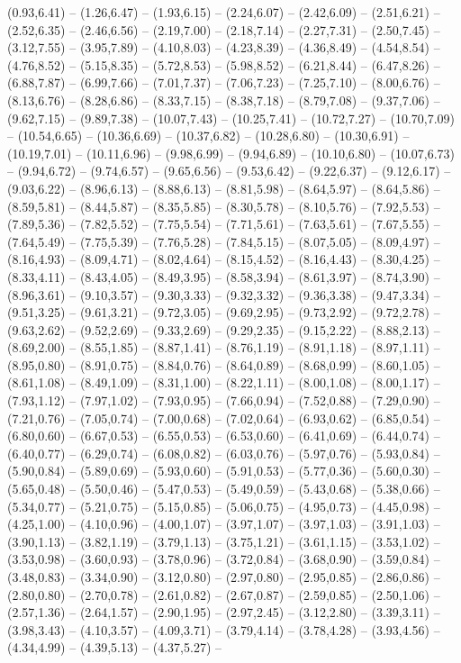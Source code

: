 \expandafter\def\csname geo:Hoehe:200\endcsname{
  (0.93,6.41) -- (1.26,6.47) -- (1.93,6.15) -- (2.24,6.07) -- (2.42,6.09) -- (2.51,6.21) -- (2.52,6.35) -- (2.46,6.56) -- (2.19,7.00) -- (2.18,7.14) -- (2.27,7.31) -- (2.50,7.45) -- (3.12,7.55) -- (3.95,7.89) -- (4.10,8.03) -- (4.23,8.39) -- (4.36,8.49) -- (4.54,8.54) -- (4.76,8.52) -- (5.15,8.35) -- (5.72,8.53) -- (5.98,8.52) -- (6.21,8.44) -- (6.47,8.26) -- (6.88,7.87) -- (6.99,7.66) -- (7.01,7.37) -- (7.06,7.23) -- (7.25,7.10) -- (8.00,6.76) -- (8.13,6.76) -- (8.28,6.86) -- (8.33,7.15) -- (8.38,7.18) -- (8.79,7.08) -- (9.37,7.06) -- (9.62,7.15) -- (9.89,7.38) -- (10.07,7.43) -- (10.25,7.41) -- (10.72,7.27) -- (10.70,7.09) -- (10.54,6.65) -- (10.36,6.69) -- (10.37,6.82) -- (10.28,6.80) -- (10.30,6.91) -- (10.19,7.01) -- (10.11,6.96) -- (9.98,6.99) -- (9.94,6.89) -- (10.10,6.80) -- (10.07,6.73) -- (9.94,6.72) -- (9.74,6.57) -- (9.65,6.56) -- (9.53,6.42) -- (9.22,6.37) -- (9.12,6.17) -- (9.03,6.22) -- (8.96,6.13) -- (8.88,6.13) -- (8.81,5.98) -- (8.64,5.97) -- (8.64,5.86) -- (8.59,5.81) -- (8.44,5.87) -- (8.35,5.85) -- (8.30,5.78) -- (8.10,5.76) -- (7.92,5.53) -- (7.89,5.36) -- (7.82,5.52) -- (7.75,5.54) -- (7.71,5.61) -- (7.63,5.61) -- (7.67,5.55) -- (7.64,5.49) -- (7.75,5.39) -- (7.76,5.28) -- (7.84,5.15) -- (8.07,5.05) -- (8.09,4.97) -- (8.16,4.93) -- (8.09,4.71) -- (8.02,4.64) -- (8.15,4.52) -- (8.16,4.43) -- (8.30,4.25) -- (8.33,4.11) -- (8.43,4.05) -- (8.49,3.95) -- (8.58,3.94) -- (8.61,3.97) -- (8.74,3.90) -- (8.96,3.61) -- (9.10,3.57) -- (9.30,3.33) -- (9.32,3.32) -- (9.36,3.38) -- (9.47,3.34) -- (9.51,3.25) -- (9.61,3.21) -- (9.72,3.05) -- (9.69,2.95) -- (9.73,2.92) -- (9.72,2.78) -- (9.63,2.62) -- (9.52,2.69) -- (9.33,2.69) -- (9.29,2.35) -- (9.15,2.22) -- (8.88,2.13) -- (8.69,2.00) -- (8.55,1.85) -- (8.87,1.41) -- (8.76,1.19) -- (8.91,1.18) -- (8.97,1.11) -- (8.95,0.80) -- (8.91,0.75) -- (8.84,0.76) -- (8.64,0.89) -- (8.68,0.99) -- (8.60,1.05) -- (8.61,1.08) -- (8.49,1.09) -- (8.31,1.00) -- (8.22,1.11) -- (8.00,1.08) -- (8.00,1.17) -- (7.93,1.12) -- (7.97,1.02) -- (7.93,0.95) -- (7.66,0.94) -- (7.52,0.88) -- (7.29,0.90) -- (7.21,0.76) -- (7.05,0.74) -- (7.00,0.68) -- (7.02,0.64) -- (6.93,0.62) -- (6.85,0.54) -- (6.80,0.60) -- (6.67,0.53) -- (6.55,0.53) -- (6.53,0.60) -- (6.41,0.69) -- (6.44,0.74) -- (6.40,0.77) -- (6.29,0.74) -- (6.08,0.82) -- (6.03,0.76) -- (5.97,0.76) -- (5.93,0.84) -- (5.90,0.84) -- (5.89,0.69) -- (5.93,0.60) -- (5.91,0.53) -- (5.77,0.36) -- (5.60,0.30) -- (5.65,0.48) -- (5.50,0.46) -- (5.47,0.53) -- (5.49,0.59) -- (5.43,0.68) -- (5.38,0.66) -- (5.34,0.77) -- (5.21,0.75) -- (5.15,0.85) -- (5.06,0.75) -- (4.95,0.73) -- (4.45,0.98) -- (4.25,1.00) -- (4.10,0.96) -- (4.00,1.07) -- (3.97,1.07) -- (3.97,1.03) -- (3.91,1.03) -- (3.90,1.13) -- (3.82,1.19) -- (3.79,1.13) -- (3.75,1.21) -- (3.61,1.15) -- (3.53,1.02) -- (3.53,0.98) -- (3.60,0.93) -- (3.78,0.96) -- (3.72,0.84) -- (3.68,0.90) -- (3.59,0.84) -- (3.48,0.83) -- (3.34,0.90) -- (3.12,0.80) -- (2.97,0.80) -- (2.95,0.85) -- (2.86,0.86) -- (2.80,0.80) -- (2.70,0.78) -- (2.61,0.82) -- (2.67,0.87) -- (2.59,0.85) -- (2.50,1.06) -- (2.57,1.36) -- (2.64,1.57) -- (2.90,1.95) -- (2.97,2.45) -- (3.12,2.80) -- (3.39,3.11) -- (3.98,3.43) -- (4.10,3.57) -- (4.09,3.71) -- (3.79,4.14) -- (3.78,4.28) -- (3.93,4.56) -- (4.34,4.99) -- (4.39,5.13) -- (4.37,5.27) -- }
